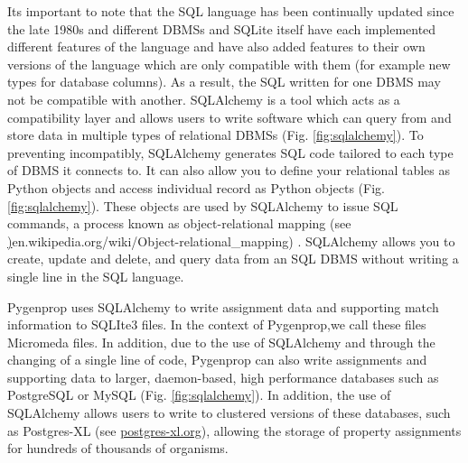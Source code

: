 Its important to note that the SQL language has been continually updated since the late 1980s \cite{sql1987guide, ISO9075} and different DBMSs and SQLite itself have each implemented different features of the language and have also added features to their own versions of the language which are only compatible with them (for example new types for database columns). As a result, the SQL written for one DBMS may not be compatible with another. SQLAlchemy \cite{bayer2014sqlalchemy} is a tool which acts as a compatibility layer and allows users to write software which can query from and store data in multiple types of relational DBMSs (Fig. \ref{fig:sqlalchemy}). To preventing incompatibly, SQLAlchemy generates SQL code tailored to each type of DBMS it connects to. It can also allow you to define your relational tables as Python objects and access individual record as Python objects (Fig. \ref{fig:sqlalchemy}). These objects are used by SQLAlchemy to issue SQL commands, a process known as object-relational mapping (see \href{https://en.wikipedia.org/wiki/Object-relational\_mapping}){en.wikipedia.org/wiki/Object-relational\_mapping}) \cite{o2008object}. SQLAlchemy allows you to create, update and delete, and query data from an SQL DBMS without writing a single line in the SQL language.

Pygenprop uses SQLAlchemy to write assignment data and supporting match information to SQLIte3 files. In the context of Pygenprop,we call these files Micromeda files. In addition, due to the use of SQLAlchemy and through the changing of a single line of code, Pygenprop can also write assignments and supporting data to larger, daemon-based, high performance databases such as PostgreSQL or MySQL (Fig. \ref{fig:sqlalchemy}). In addition, the use of SQLAlchemy allows users to write to clustered versions of these databases, such as Postgres-XL (see \href{www.postgres-xl.org}{postgres-xl.org}), allowing the storage of property assignments for hundreds of thousands of organisms.

